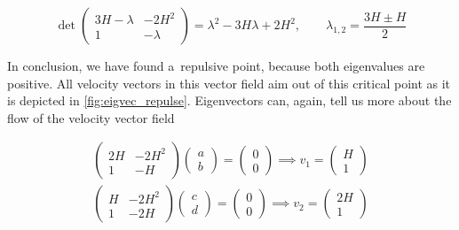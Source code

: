 \begin{equation}
    \det     
    \begin{pmatrix}
        3H - \lambda & -2H^2 \\
        1 & -\lambda
    \end{pmatrix} = 
    \lambda^2 - 3H \lambda + 2H^2, \qquad \lambda_{1,2} = \frac{3H \pm H}{2}
\end{equation}

\noindent
In conclusion, we have found a~repulsive point, because both eigenvalues are positive. All velocity vectors in this vector field aim out of this critical point as it is depicted in \cref{fig:eigvec_repulse}. Eigenvectors can, again, tell us more about the flow of the velocity vector field

\begin{align}
    \begin{pmatrix}
        2H & -2H^2 \\
        1 & -H
    \end{pmatrix} 
    \begin{pmatrix}
        a \\ b
    \end{pmatrix} 
    = \begin{pmatrix}
        0 \\ 0
    \end{pmatrix} \implies
    v_1 = \begin{pmatrix}
        H \\ 1
    \end{pmatrix}
    \\
    \begin{pmatrix}
        H & -2H^2 \\
        1 & -2H
    \end{pmatrix} 
    \begin{pmatrix}
        c \\ d
    \end{pmatrix} 
    = \begin{pmatrix}
        0 \\ 0
    \end{pmatrix} \implies
    v_2 = \begin{pmatrix}
        2H \\ 1
    \end{pmatrix}
\end{align}

